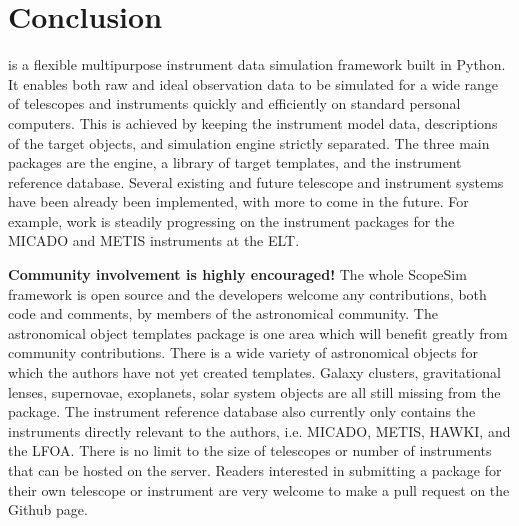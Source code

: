 \section{Conclusion}
\label{conclusion}

\ScopeSim{} is a flexible multipurpose instrument data simulation framework built in Python.
It enables both raw and ideal observation data to be simulated for a wide range of telescopes and instruments quickly and efficiently on standard personal computers.
This is achieved by keeping the instrument model data, descriptions of the target objects, and simulation engine strictly separated.
The three main packages are the \ScopeSim{} engine, a library of target templates, and the instrument reference database.
Several existing and future telescope and instrument systems have been already been implemented, with more to come in the future.
For example, work is steadily progressing on the instrument packages for the MICADO and METIS\cite{metis2018} instruments at the ELT.

\textbf{Community involvement is highly encouraged!}
The whole ScopeSim framework is open source and the developers welcome any contributions, both code and comments, by members of the astronomical community.
The astronomical object templates package is one area which will benefit greatly from community contributions.
There is a wide variety of astronomical objects for which the authors have not yet created templates.
Galaxy clusters, gravitational lenses, supernovae, exoplanets, solar system objects are all still missing from the \ScopeSimtemplates package.
The instrument reference database also currently only contains the instruments directly relevant to the authors, i.e. MICADO, METIS, HAWKI, and the LFOA.
There is no limit to the size of telescopes or number of instruments that can be hosted on the server.
Readers interested in submitting a package for their own telescope or instrument are very welcome to make a pull request on the \IRDB Github page.
